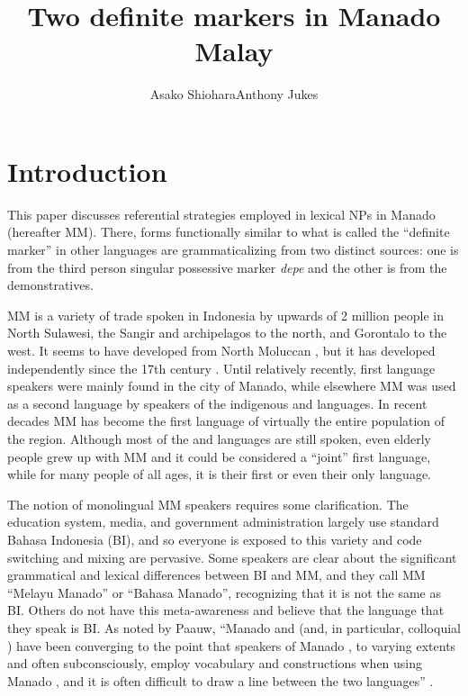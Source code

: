 \documentclass[output=paper
,modfonts
,nonflat]{langsci/langscibook}
\title{Two definite markers in Manado Malay}
\author{Asako Shiohara\affiliation{Tokyo University of Foreign Studies}\lastand Anthony Jukes\affiliation{La Trobe University}}
\begin{document}
\maketitle

\section{\label{s:shiohara:1}Introduction}

This paper discusses referential strategies employed in lexical NPs in Manado  (hereafter MM). There, forms functionally similar to what is called the “definite marker” in other languages are grammaticalizing from two distinct sources: one is from the third person singular possessive marker \textit{depe} and the other is from the demonstratives.

MM is a variety of trade  spoken in Indonesia by upwards of 2 million people in North Sulawesi, the Sangir and  archipelagos to the north, and Gorontalo to the west. It seems to have developed from North Moluccan , but it has developed independently since the 17th century \citep[43--44]{Paauw2008}. Until relatively recently, first language speakers were mainly found in the city of Manado, while elsewhere MM was used as a second language by speakers of the indigenous  and  languages. In recent decades MM has become the first language of virtually the entire population of the region. Although most of the  and  languages are still spoken, even elderly people grew up with MM and it could be considered a “joint” first language, while for many people of all ages, it is their first or even their only language. 

The notion of monolingual MM speakers requires some clarification. The education system, media, and government administration largely use standard Bahasa Indonesia (BI), and so everyone is exposed to this variety and code switching and mixing are pervasive. Some speakers are clear about the significant grammatical and lexical differences between BI and MM, and they call MM “Melayu Manado” or “Bahasa Manado”, recognizing that it is not the same as BI. Others do not have this meta-awareness and believe that the language that they speak is BI. As noted by Paauw, “Manado  and  (and, in particular, colloquial ) have been converging to the point that speakers of Manado , to varying extents and often subconsciously, employ  vocabulary and constructions when using Manado , and it is often difficult to draw a line between the two languages” \citep[44]{Paauw2008}.
\end{document}
